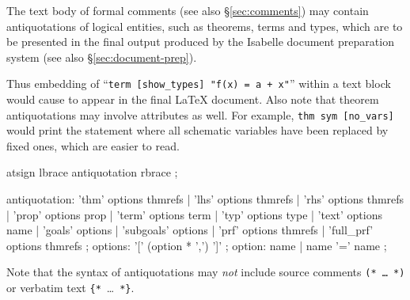 The text body of formal comments (see also \S\ref{sec:comments}) may contain
antiquotations of logical entities, such as theorems, terms and types, which
are to be presented in the final output produced by the Isabelle document
preparation system (see also \S\ref{sec:document-prep}).

Thus embedding of
``\texttt{{\at}{\ttlbrace}term~[show_types]~"f(x)~=~a~+~x"{\ttrbrace}}''
within a text block would cause
to appear in the final {\LaTeX} document.  Also note that theorem
antiquotations may involve attributes as well.  For example,
\texttt{{\at}{\ttlbrace}thm~sym~[no_vars]{\ttrbrace}} would print the
statement where all schematic variables have been replaced by fixed ones,
which are easier to read.

\begin{rail}
  atsign lbrace antiquotation rbrace
  ;

  antiquotation:
    'thm' options thmrefs |
    'lhs' options thmrefs |
    'rhs' options thmrefs |
    'prop' options prop |
    'term' options term |
    'typ' options type |
    'text' options name |
    'goals' options |
    'subgoals' options |
    'prf' options thmrefs |
    'full\_prf' options thmrefs
  ;
  options: '[' (option * ',') ']'
  ;
  option: name | name '=' name
  ;
\end{rail}

Note that the syntax of antiquotations may \emph{not} include source comments
\texttt{(*~\dots~*)} or verbatim text \verb|{*|~\dots~\verb|*}|.

